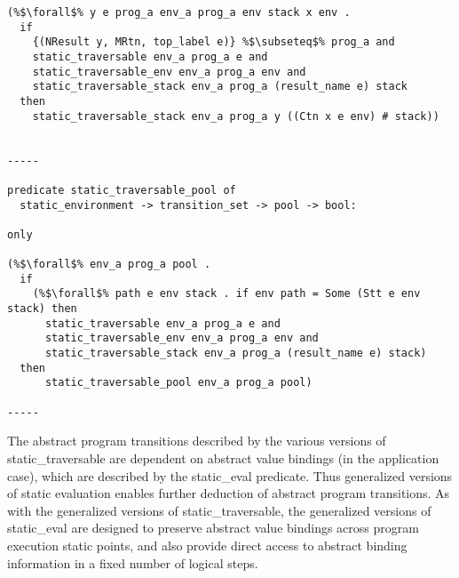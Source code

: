 \documentclass{article}
\begin{document}
\begin{lstlisting}[language=logic, escapechar=\%]
(%$\forall$% y e prog_a env_a prog_a env stack x env .
  if 
    {(NResult y, MRtn, top_label e)} %$\subseteq$% prog_a and
    static_traversable env_a prog_a e and
    static_traversable_env env_a prog_a env and
    static_traversable_stack env_a prog_a (result_name e) stack 
  then 
    static_traversable_stack env_a prog_a y ((Ctn x e env) # stack))


-----

predicate static_traversable_pool of
  static_environment -> transition_set -> pool -> bool:

only

(%$\forall$% env_a prog_a pool .
  if
    (%$\forall$% path e env stack . if env path = Some (Stt e env stack) then 
      static_traversable env_a prog_a e and 
      static_traversable_env env_a prog_a env and 
      static_traversable_stack env_a prog_a (result_name e) stack) 
  then
      static_traversable_pool env_a prog_a pool)

-----

\end{lstlisting}

The abstract program transitions described by the various versions of static\_traversable are
dependent on abstract value bindings (in the application case), which are described by the
static\_eval predicate.  Thus generalized versions of static evaluation enables further
deduction of abstract program transitions.  As with the generalized versions of
static\_traversable, the generalized versions of static\_eval are designed to preserve abstract
value bindings across program execution static points, and also provide direct access to abstract
binding information in a fixed number of logical steps. 
\end{document}
